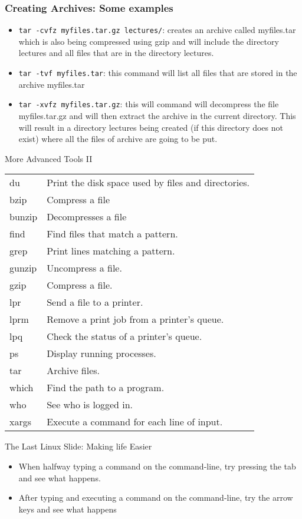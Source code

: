 \begin{frame}[fragile]\frametitle{Creating Archives: Some examples}
\begin{itemize}
\item \lstinline!tar -cvfz myfiles.tar.gz lectures/!: creates an archive called myfiles.tar which is also being compressed using gzip and will include the directory lectures and all files that are in the directory lectures.
\item \lstinline!tar -tvf myfiles.tar!: this command will list all files that are stored in the archive myfiles.tar
\item \lstinline!tar -xvfz myfiles.tar.gz!: this will command will decompress the file myfiles.tar.gz and will then extract the archive in the current directory. This will result in a directory lectures being created (if this directory does not exist) where all the files of archive are going to be put.
\end{itemize}
\end{frame}

\begin{frame}{More Advanced Tools II}
\footnotesize{
\begin{tabular}{|l|l}
du	& Print the disk space used by files and directories.\\
bzip    & Compress a file\\
bunzip  & Decompresses a file\\
find	& Find files that match a pattern.\\
grep	& Print lines matching a pattern.\\
gunzip	& Uncompress a file.\\
gzip	& Compress a file.\\
lpr	& Send a file to a printer.\\
lprm	& Remove a print job from a printer's queue.\\
lpq	& Check the status of a printer's queue.\\
ps	& Display running processes.\\
tar	& Archive files.\\
which	& Find the path to a program.\\
who	& See who is logged in.\\
xargs	& Execute a command for each line of input.
\end{tabular}}
\end{frame}

\begin{frame}{The Last Linux Slide: Making life Easier}
\begin{itemize}
\item When halfway typing a command on the command-line, try pressing the tab and see what happens.
\item After typing and executing a command on the command-line, try the arrow keys and see what happens
\end{itemize}
\end{frame}


